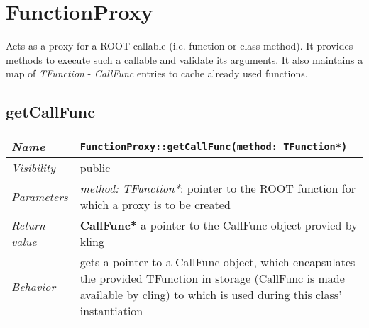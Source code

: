 \chapter{FunctionProxy}
	Acts as a proxy for a ROOT callable (i.e. function or class method). It provides methods to execute such a callable and validate its arguments. It also maintains a map of \textit{TFunction} - \textit{CallFunc} entries to cache already used functions.

\section{getCallFunc}
\begin{longtable}{p{3cm} @{\hskip 1cm} p{12cm}}
	\hline

	\textit{Name} & \texttt{FunctionProxy::getCallFunc(method: TFunction*)}\\
	\hline

	\textit{Visibility} & public\\
	\hline

	\textit{Parameters} &  \textit{method: TFunction*}: pointer to the ROOT function for which a proxy 
							is to be created\\
	\hline

	\textit{Return value} & \textbf{CallFunc*} a pointer to the CallFunc object provied by kling\\
	\hline

	\textit{Behavior} & gets a pointer to a CallFunc object, which encapsulates the provided TFunction 
			in storage (CallFunc is made available by cling)  to which is used during this class' instantiation\\
	\hline

\end{longtable} \pagebreak

